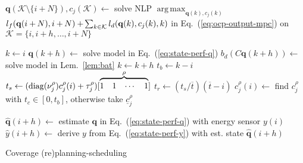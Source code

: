 \documentclass[letterpaper,10pt,journal,twoside]{IEEEtran}
\theoremstyle{definition}
\DeclareMathOperator*{\argmax}{arg\,max}
\begin{document}
\begin{algorithm}[t]
  \begin{algorithmic}[1]
    \small
      \makeatletter
      \setcounter{ALC@line}{15}
      \makeatother
      \STATE $\mathbf{q}(\mathcal{K}\setminus\{i+N\}),c_j(\mathcal{K})\gets${ \vspace*{.3ex}solve NLP }$\argmax_{\mathbf{q}(k),c_j(k)}$ \vspace*{.7ex}\hspace*{1em}${l_f(\mathbf{q}(i+\hspace*{-.1ex}N),i+\hspace*{-.1ex}N)}+\hspace*{-.2ex}{\sum_{k\in\mathcal{K}}{l_d(\mathbf{q}(k),c_j(k),k)}}${ in Eq.~(\ref{eq:ocp-output-mpc}) \hspace*{1em}on }$\mathcal{K}=\{i,i+h,\dots,i+N\}$\vspace*{.3ex}\label{alg:mpc}
      
      \vspace*{.8ex}
      \STATE $k\gets i$\vspace*{.3ex}\label{alg:bat1}
      \vspace*{.3ex}
          \STATE $\mathbf{q}(k+h)\gets${ solve model in Eq.~(\ref{eq:state-perf-q})}\vspace*{.3ex}\label{alg:evol}
        \ENDIF
        \STATE $b_d(C\mathbf{q}(k+h))\gets${ solve model in Lem.~\ref{lem:bat}}\vspace*{.3ex}
        \STATE $k\gets k+h$\vspace*{.3ex}
      \ENDWHILE
      \STATE $t_b\gets k-i$\vspace*{.3ex}\label{alg:bat2}
      \STATE $t_s\gets(\mathrm{diag}(\nu_j^\rho)\vspace*{.3ex}c_j^\rho(i)+\tau_j^\rho)[\overbrace{\begin{matrix}1&1&\cdots&1\end{matrix}}^{\rho}]$\vspace*{.3ex}\label{alg:traj1}
      \STATE $t_r\gets(t_s/\overline{t})(\overline{t}-i)$\vspace*{.3ex}
        \STATE $c_j^{\rho}(i)\gets${ find }$c_j^{\rho}${ with }$t_c\in[0,t_b]${, otherwise take }$\underline{c}_j^\rho$\vspace*{.3ex}\label{alg:traj2}
      \ENDIF

      \vspace*{.8ex}
      \STATE $\hat{\mathbf{q}}(i+h)\gets${ estimate }$\mathbf{q}${ in Eq.~(\ref{eq:state-perf-q}) with energy sensor }$y(i)$\vspace*{.3ex}\label{alg:klm1}
      \STATE $\hat{y}(i+h)\gets${ derive }$y${ from Eq.~(\ref{eq:state-perf-y}) with est. state }$\hat{\mathbf{q}}(i+h)$\vspace*{.3ex}\label{alg:klm2}
    \ENDFOR
  \end{algorithmic}
  \caption{Coverage (re)planning-scheduling}\label{alg}
\end{algorithm}
\end{document}
